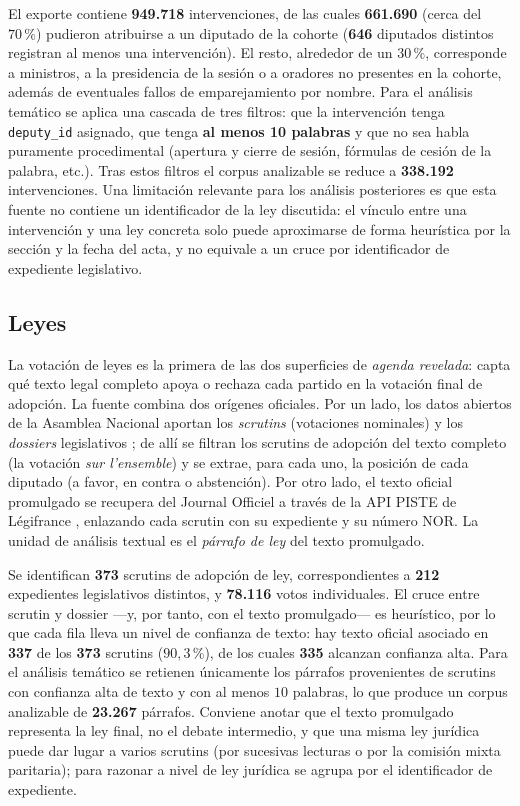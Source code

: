 El exporte contiene \textbf{949.718} intervenciones, de las cuales
\textbf{661.690} (cerca del $70\,\%$) pudieron atribuirse a un diputado de la
cohorte (\textbf{646} diputados distintos registran al menos una intervención).
El resto, alrededor de un $30\,\%$, corresponde a ministros, a la presidencia de
la sesión o a oradores no presentes en la cohorte, además de eventuales fallos de
emparejamiento por nombre. Para el análisis temático se aplica una cascada de
tres filtros: que la intervención tenga \texttt{deputy\_id} asignado, que tenga
\textbf{al menos 10 palabras} y que no sea habla puramente procedimental
(apertura y cierre de sesión, fórmulas de cesión de la palabra, etc.). Tras estos
filtros el corpus analizable se reduce a \textbf{338.192} intervenciones. Una
limitación relevante para los análisis posteriores es que esta fuente no contiene
un identificador de la ley discutida: el vínculo entre una intervención y una ley
concreta solo puede aproximarse de forma heurística por la sección y la fecha del
acta, y no equivale a un cruce por identificador de expediente legislativo.

\subsection{Leyes}
\label{sec:corpus-leyes}

La votación de leyes es la primera de las dos superficies de \emph{agenda
revelada}: capta qué texto legal completo apoya o rechaza cada partido en la
votación final de adopción. La fuente combina dos orígenes oficiales. Por un
lado, los datos abiertos de la Asamblea Nacional aportan los \emph{scrutins}
(votaciones nominales) y los \emph{dossiers} legislativos
\cite{an_opendata_xv}; de allí se filtran los scrutins de adopción del texto
completo (la votación \emph{sur l'ensemble}) y se extrae, para cada uno, la
posición de cada diputado (a favor, en contra o abstención). Por otro lado, el
texto oficial promulgado se recupera del Journal Officiel a través de la API
PISTE de Légifrance \cite{legifrance_piste}, enlazando cada scrutin con su
expediente y su número NOR. La unidad de análisis textual es el \emph{párrafo de
ley} del texto promulgado.

Se identifican \textbf{373} scrutins de adopción de ley, correspondientes a
\textbf{212} expedientes legislativos distintos, y \textbf{78.116} votos
individuales. El cruce entre scrutin y dossier ---y, por tanto, con el texto
promulgado--- es heurístico, por lo que cada fila lleva un nivel de confianza de
texto: hay texto oficial asociado en \textbf{337} de los \textbf{373} scrutins
($90{,}3\,\%$), de los cuales \textbf{335} alcanzan confianza alta. Para el
análisis temático se retienen únicamente los párrafos provenientes de scrutins
con confianza alta de texto y con al menos $10$ palabras, lo que produce un
corpus analizable de \textbf{23.267} párrafos. Conviene anotar que el texto
promulgado representa la ley final, no el debate intermedio, y que una misma ley
jurídica puede dar lugar a varios scrutins (por sucesivas lecturas o por la
comisión mixta paritaria); para razonar a nivel de ley jurídica se agrupa por el
identificador de expediente.

